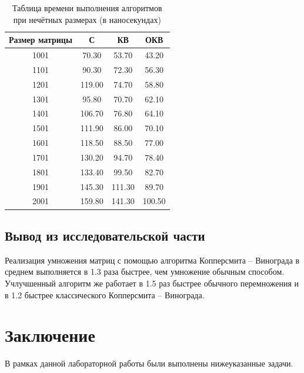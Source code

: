 \documentclass[12pt]{report}
\begin{document}
\begin{table} [h!]
	\caption{Таблица времени выполнения алгоритмов при нечётных размерах (в наносекундах)}
	\begin{center}
	\begin{tabular}{|c c c c|} 
		\hline
		Размер матрицы & С & КВ & ОКВ \\  
		\hline
        1001 & 70.30 & 53.70 & 43.20  \\ 
        \hline
        1101 & 90.30 & 72.30 & 56.30  \\ 
        \hline
        1201 & 119.00 & 74.70 & 58.80  \\ 
        \hline
        1301 & 95.80 & 70.70 & 62.10  \\ 
        \hline
        1401 & 106.70 & 76.80 & 64.10  \\ 
        \hline
        1501 & 111.90 & 86.00 & 70.10  \\ 
        \hline
        1601 & 118.50 & 88.50 & 77.00  \\ 
        \hline
        1701 & 130.20 & 94.70 & 78.40  \\ 
        \hline
        1801 & 133.40 & 99.50 & 82.70  \\ 
        \hline
        1901 & 145.30 & 111.30 & 89.70  \\ 
        \hline
        2001 & 159.80 & 141.30 & 100.50  \\ 
        \hline
	\end{tabular}
\end{center}
\end{table}


\section{Вывод из исследовательской части}

Реализация умножения матриц с помощью алгоритма Копперсмита -- Винограда в среднем выполняется в 1.3 раза быстрее, чем умножение обычным способом. Учлучшенный алгоритм же работает в 1.5 раз быстрее обычного перемножения и в 1.2 быстрее классического Копперсмита -- Винограда.



\chapter*{Заключение}

В рамках данной лабораторной работы были выполнены нижеуказанные задачи.
\end{document}
